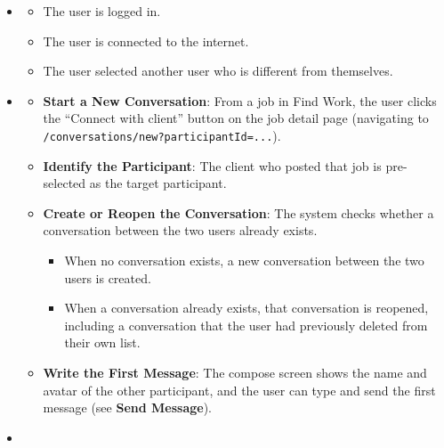 \begin{itemize}[leftmargin=1.6em,topsep=4pt,itemsep=3pt,parsep=0pt,label=$\bullet$]
    \item {}
        \begin{itemize}[leftmargin=2.2em,topsep=2pt,itemsep=3pt,parsep=0pt,label=$\circ$]
            \item The user is logged in.
            \item The user is connected to the internet.
            \item The user selected another user who is different from themselves.
        \end{itemize}
    \item {}
        \begin{itemize}[leftmargin=2.2em,topsep=2pt,itemsep=3pt,parsep=0pt,label=$\circ$]
            \item \textbf{Start a New Conversation}: From a job in Find Work, the user clicks the ``Connect with client'' button on the job detail page (navigating to \texttt{/conversations/new?participantId=...}).
            \item \textbf{Identify the Participant}: The client who posted that job is pre-selected as the target participant.
            \item \textbf{Create or Reopen the Conversation}: The system checks whether a conversation between the two users already exists.\
                \begin{itemize}[leftmargin=2.2em,topsep=2pt,itemsep=3pt,parsep=0pt,label=$\blacksquare$]
                    \item When no conversation exists, a new conversation between the two users is created.
                    \item When a conversation already exists, that conversation is reopened, including a conversation that the user had previously deleted from their own list.
                \end{itemize}
            \item \textbf{Write the First Message}: The compose screen shows the name and avatar of the other participant, and the user can type and send the first message (see \textbf{Send Message}).
        \end{itemize}
    \item {}
        \begin{itemize}[leftmargin=2.2em,topsep=2pt,itemsep=3pt,parsep=0pt,label=$\circ$]

\end{itemize}
\end{itemize}
